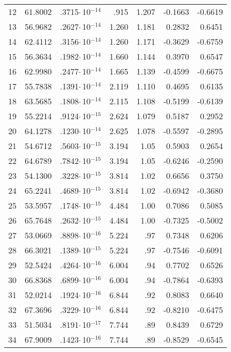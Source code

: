 {\begin{longtable}{|l||r|r|r|r|r|r|}
12 & 61.8002 & .3715$\cdot$\,10$^{-14}$ & .915 & 1.207 & -0.1663 & -0.6619 \\
13 & 56.9682 & .2627$\cdot$\,10$^{-14}$ & 1.260 & 1.181 & 0.2832 & 0.6451 \\
14 & 62.4112 & .3156$\cdot$\,10$^{-14}$ & 1.260 & 1.171 & -0.3629 & -0.6759 \\
15 & 56.3634 & .1982$\cdot$\,10$^{-14}$ & 1.660 & 1.144 & 0.3970 &  0.6547 \\
16 & 62.9980 & .2477$\cdot$\,10$^{-14}$ & 1.665 & 1.139 & -0.4599 & -0.6675 \\
17 & 55.7838 & .1391$\cdot$\,10$^{-14}$ & 2.119 & 1.110 & 0.4695 & 0.6135 \\
18 & 63.5685 & .1808$\cdot$\,10$^{-14}$ & 2.115 & 1.108 & -0.5199 & -0.6139 \\
19 & 55.2214 & .9124$\cdot$\,10$^{-15}$ & 2.624 & 1.079 & 0.5187 & 0.2952 \\
20 & 64.1278 & .1230$\cdot$\,10$^{-14}$ & 2.625 & 1.078 & -0.5597 & -0.2895 \\
21 & 54.6712 & .5603$\cdot$\,10$^{-15}$ & 3.194 & 1.05 & 0.5903 & 0.2654 \\
22 & 64.6789 & .7842$\cdot$\,10$^{-15}$ & 3.194 & 1.05 & -0.6246 & -0.2590 \\
23 & 54.1300 & .3228$\cdot$\,10$^{-15}$ & 3.814 & 1.02 & 0.6656 & 0.3750 \\
24 & 65.2241 & .4689$\cdot$\,10$^{-15}$ & 3.814 & 1.02 & -0.6942 & -0.3680 \\
25 & 53.5957 & .1748$\cdot$\,10$^{-15}$ & 4.484 & 1.00 & 0.7086 & 0.5085 \\
26 & 65.7648 & .2632$\cdot$\,10$^{-15}$ & 4.484 & 1.00 & -0.7325 & -0.5002 \\
27 & 53.0669 & .8898$\cdot$\,10$^{-16}$ & 5.224 & .97 & 0.7348 & 0.6206 \\
28 & 66.3021 & .1389$\cdot$\,10$^{-15}$ & 5.224 & .97 & -0.7546 & -0.6091 \\
29 & 52.5424 & .4264$\cdot$\,10$^{-16}$ & 6.004 & .94 & 0.7702 & 0.6526 \\
30 & 66.8368 & .6899$\cdot$\,10$^{-16}$ & 6.004 & .94 & -0.7864 & -0.6393 \\
31 & 52.0214 & .1924$\cdot$\,10$^{-16}$ & 6.844 & .92 & 0.8083 & 0.6640 \\
32 & 67.3696 & .3229$\cdot$\,10$^{-16}$ & 6.844 & .92 & -0.8210 & -0.6475 \\
33 & 51.5034 & .8191$\cdot$\,10$^{-17}$ & 7.744 & .89 & 0.8439 & 0.6729 \\
34 & 67.9009 & .1423$\cdot$\,10$^{-16}$ & 7.744 & .89 & -0.8529 & -0.6545 \\

\end{longtable}}
